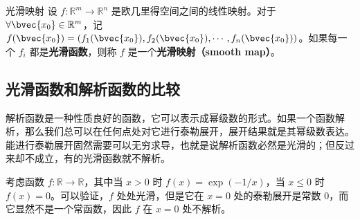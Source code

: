 \begin{definition}{光滑映射}
设 $f:\mathbb{R}^m\rightarrow \mathbb{R}^n$ 是欧几里得空间之间的线性映射。对于 $\forall \bvec{x_0} \in \mathbb{R}^m$，记 $f(\bvec{x_0})=(f_1(\bvec{x_0}), f_2(\bvec{x_0}),\cdots, f_n(\bvec{x_0}))$。如果每一个 $f_i$ 都是\textbf{光滑函数}，则称 $f$ 是一个\textbf{光滑映射（smooth map）}。
\end{definition}

\subsection{光滑函数和解析函数的比较}

解析函数是一种性质良好的函数，它可以表示成幂级数的形式。如果一个函数解析，那么我们总可以在任何点处对它进行泰勒展开，展开结果就是其幂级数表达。能进行泰勒展开固然需要可以无穷求导，也就是说解析函数必然是光滑的；但反过来却不成立，有的光滑函数就不解析。

\begin{example}{}\label{ex_SmthM_1}
考虑函数 $f:\mathbb{R}\rightarrow\mathbb{R}$，其中当 $x>0$ 时 $f(x)=\exp{(-1/x)}$，当 $x\leq 0$ 时 $f(x)=0$。可以验证，$f$ 处处光滑，但是它在 $x=0$ 处的泰勒展开是常数 $0$，而它显然不是一个常函数，因此 $f$ 在 $x=0$ 处不解析。
\end{example}



